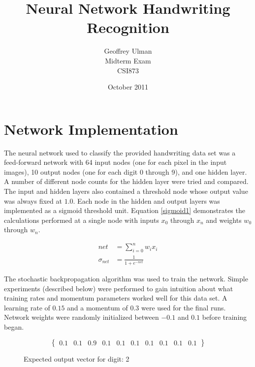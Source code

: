 \documentclass{article}
\begin{document}
\title{Neural Network Handwriting Recognition}
\author{Geoffrey Ulman\\
        Midterm Exam\\
        CSI873}
\date{October 2011}
\maketitle

\tableofcontents

\section{Network Implementation}\label{Network Parameters}

The neural network used to classify the provided handwriting data set was a feed-forward network with 64 input nodes (one for each pixel in the input images), 10 output nodes (one for each digit 0 through 9), and one hidden layer. A number of different node counts for the hidden layer were tried and compared. The input and hidden layers also contained a threshold node whose output value was always fixed at \(1.0\). Each node in the hidden and output layers was implemented as a sigmoid threshold unit. Equation \ref{sigmoid1} demonstrates the calculations performed at a single node with inputs \(x_{0}\) through \(x_{n}\) and weights \(w_{0}\) through \(w_{n}\).

\begin{equation}\label{sigmoid1}
\begin{split}
net &= \sum\limits_{i=0}^n w_{i}x_{i}\\
\sigma_{net} &= \frac{1}{1+e^{-net}}
\end{split}
\end{equation}

The stochastic backpropagation algorithm was used to train the network. Simple experiments (described below) were performed to gain intuition about what training rates and momentum parameters worked well for this data set. A learning rate of \(0.15\) and a momentum of \(0.3\) were used for the final runs. Network weights were randomly initialized between \(-0.1\) and \(0.1\) before training began.

\begin{figure}\label{expected1}
\[ \begin{Bmatrix} 0.1 & 0.1 & 0.9 & 0.1 & 0.1 & 0.1 & 0.1 & 0.1 & 0.1 & 0.1 \end{Bmatrix} \]
\caption{Expected output vector for digit: 2}
\end{figure}
\end{document}
